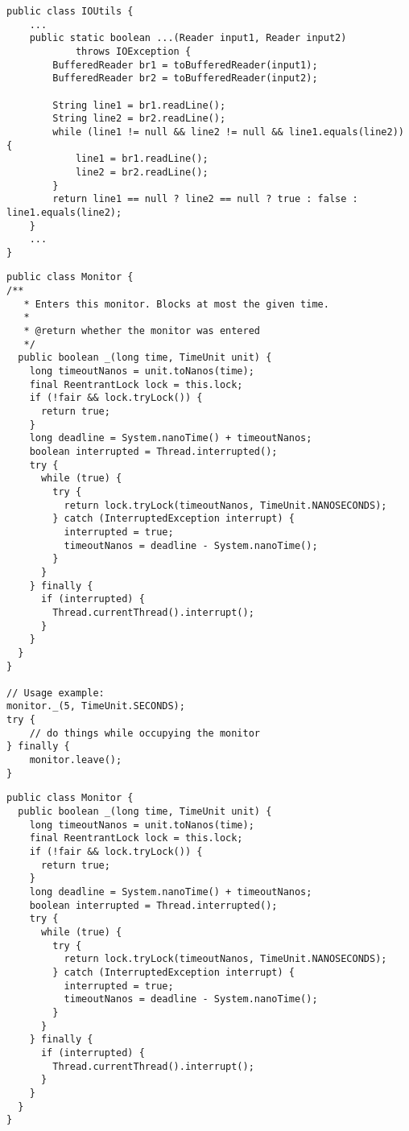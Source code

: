 \begin{code}
\begin{verbatim}
public class IOUtils {
	...
    public static boolean ...(Reader input1, Reader input2)
            throws IOException {
        BufferedReader br1 = toBufferedReader(input1);
        BufferedReader br2 = toBufferedReader(input2);

        String line1 = br1.readLine();
        String line2 = br2.readLine();
        while (line1 != null && line2 != null && line1.equals(line2)) {
            line1 = br1.readLine();
            line2 = br2.readLine();
        }
        return line1 == null ? line2 == null ? true : false : line1.equals(line2);
    }
    ...
}
\end{verbatim}
\caption{Commons IO 2.4 IOUtils.contentEqualsIgnoreEOL Variant 2}
\label{lst:ioutils.contentequalsignoreeol-variant1}
\end{code}

\newpage
\begin{code}
\begin{verbatim}
public class Monitor {
/**
   * Enters this monitor. Blocks at most the given time.
   *
   * @return whether the monitor was entered
   */
  public boolean _(long time, TimeUnit unit) {
    long timeoutNanos = unit.toNanos(time);
    final ReentrantLock lock = this.lock;
    if (!fair && lock.tryLock()) {
      return true;
    }
    long deadline = System.nanoTime() + timeoutNanos;
    boolean interrupted = Thread.interrupted();
    try {
      while (true) {
        try {
          return lock.tryLock(timeoutNanos, TimeUnit.NANOSECONDS);
        } catch (InterruptedException interrupt) {
          interrupted = true;
          timeoutNanos = deadline - System.nanoTime();
        }
      }
    } finally {
      if (interrupted) {
        Thread.currentThread().interrupt();
      }
    }
  }
}

// Usage example:
monitor._(5, TimeUnit.SECONDS);
try {
	// do things while occupying the monitor
} finally {
	monitor.leave();
}
\end{verbatim}
\caption{Guava 17.0 Monitor.enter Variant 1}
\label{lst:guava-monitorenter-variant1}
\end{code}

\newpage
\begin{code}
\begin{verbatim}
public class Monitor {
  public boolean _(long time, TimeUnit unit) {
    long timeoutNanos = unit.toNanos(time);
    final ReentrantLock lock = this.lock;
    if (!fair && lock.tryLock()) {
      return true;
    }
    long deadline = System.nanoTime() + timeoutNanos;
    boolean interrupted = Thread.interrupted();
    try {
      while (true) {
        try {
          return lock.tryLock(timeoutNanos, TimeUnit.NANOSECONDS);
        } catch (InterruptedException interrupt) {
          interrupted = true;
          timeoutNanos = deadline - System.nanoTime();
        }
      }
    } finally {
      if (interrupted) {
        Thread.currentThread().interrupt();
      }
    }
  }
}
\end{verbatim}
\caption{Guava 17.0 Monitor.enter Variant 2}
\label{lst:guava-monitorenter-variant2}
\end{code}

